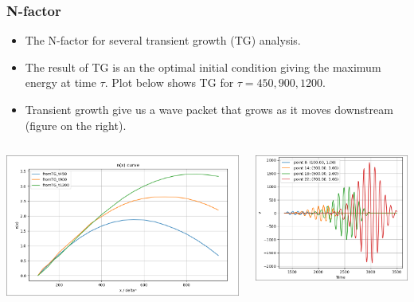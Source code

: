 \documentclass[
  aspectratio=169, %
  t, %
  onlytextwidth, %
  10pt, %
]{beamer}
\begin{document}
\begin{frame}
	\frametitle{N-factor }
	\begin{itemize}
		\item The N-factor for several transient growth (TG) analysis.
		\item The result of TG is an the optimal initial condition giving the maximum energy at time $\tau$. Plot below shows TG for $\tau = 450,900, 1200$.
		\item Transient growth give us a wave packet that grows as it moves downstream (figure on the right).
	\end{itemize}
\begin{columns}[T] %
		\begin{column}{0.49\linewidth} %
			\centering
			\includegraphics[width=0.98\linewidth]{Images/nfactorTG.png}
		\end{column}
		\begin{column}{0.49\linewidth} %
			\centering
			\includegraphics[width=0.98\linewidth]{Images/wavepacket.png}
		\end{column}
	\end{columns}

\end{frame}
\end{document}
